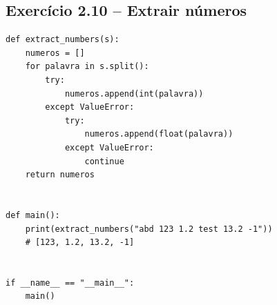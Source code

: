 \documentclass[11pt,a4paper]{article}
\begin{document}
\subsection*{Exercício 2.10 -- Extrair números}

\begin{solucao}
\begin{lstlisting}
def extract_numbers(s):
    numeros = []
    for palavra in s.split():
        try:
            numeros.append(int(palavra))
        except ValueError:
            try:
                numeros.append(float(palavra))
            except ValueError:
                continue
    return numeros


def main():
    print(extract_numbers("abd 123 1.2 test 13.2 -1"))
    # [123, 1.2, 13.2, -1]


if __name__ == "__main__":
    main()
\end{lstlisting}
\end{solucao}
\end{document}
